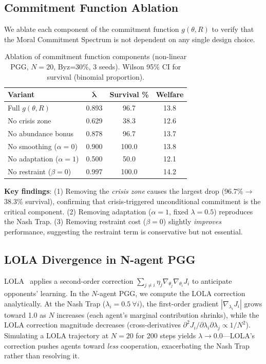 \documentclass{article}
\begin{document}
\subsection{Commitment Function Ablation}
\label{app:ablation}

We ablate each component of the commitment function $g(\theta, R)$ to verify that the Moral Commitment Spectrum is not dependent on any single design choice.

\begin{table}[h]
\centering
\caption{Ablation of commitment function components (non-linear PGG, $N{=}20$, Byz=30\%, 3 seeds). Wilson 95\% CI for survival (binomial proportion).}
\label{tab:ablation}
\begin{tabular}{lccc}
\toprule
\textbf{Variant} & $\boldsymbol{\bar{\lambda}}$ & \textbf{Survival \%} & \textbf{Welfare} \\
\midrule
Full $g(\theta,R)$ & 0.893 & 96.7 & 13.8 \\
No crisis zone & 0.629 & 38.3 & 12.6 \\
No abundance bonus & 0.878 & 96.7 & 13.7 \\
No smoothing ($\alpha{=}0$) & 0.900 & 100.0 & 13.8 \\
No adaptation ($\alpha{=}1$) & 0.500 & 50.0 & 12.1 \\
No restraint ($\beta{=}0$) & 0.997 & 100.0 & 14.2 \\
\bottomrule
\end{tabular}
\end{table}

\noindent\textbf{Key findings}: (1) Removing the \emph{crisis zone} causes the largest drop (96.7\%$\to$38.3\% survival), confirming that crisis-triggered unconditional commitment is the critical component.
(2) Removing adaptation ($\alpha{=}1$, fixed $\lambda{=}0.5$) reproduces the Nash Trap.
(3) Removing restraint cost ($\beta{=}0$) slightly \emph{improves} performance, suggesting the restraint term is conservative but not essential.

\subsection{LOLA Divergence in N-agent PGG}
\label{app:lola}

LOLA~\citep{foerster2018learning} applies a second-order correction $\sum_{j \neq i} \eta_j \nabla_{\theta_j} \nabla_{\theta_i} J_i$ to anticipate opponents' learning.
In the $N$-agent PGG, we compute the LOLA correction analytically.
At the Nash Trap ($\lambda_i{=}0.5\ \forall i$), the first-order gradient $|\nabla_{\lambda_i} J_i|$ grows toward 1.0 as $N$ increases (each agent's marginal contribution shrinks), while the LOLA correction magnitude decreases (cross-derivatives $\partial^2 J_i / \partial \lambda_i \partial \lambda_j \propto 1/N^2$).
Simulating a LOLA trajectory at $N{=}20$ for 200 steps yields $\lambda \to 0.0$---LOLA's correction pushes agents toward \emph{less} cooperation, exacerbating the Nash Trap rather than resolving it.
\end{document}
